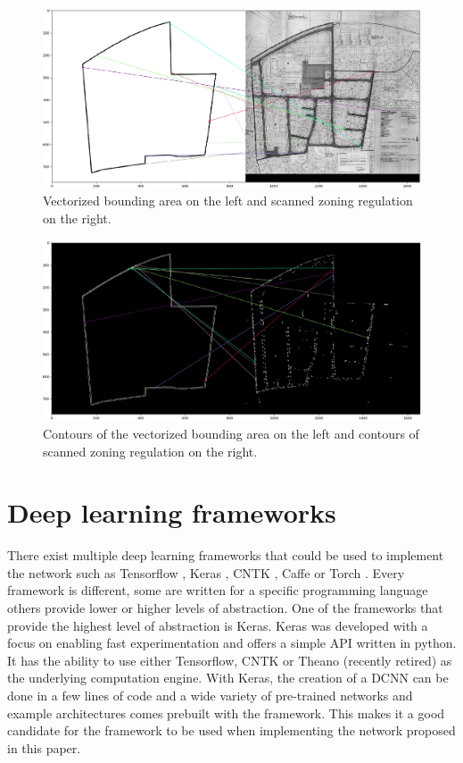 \begin{figure}[H]
    \centering
    \includegraphics[width=0.8\linewidth]{fig/test1.png}
    \caption{Vectorized bounding area on the left and scanned zoning regulation on the right.}
    \label{fig:test1}
\end{figure}

\begin{figure}[H]
    \centering
    \includegraphics[width=0.8\linewidth]{fig/test1-thresh.png}
    \caption{Contours of the vectorized bounding area on the left and contours of scanned zoning regulation on the right.}
    \label{fig:thresh}
\end{figure}

\section{Deep learning frameworks}
There exist multiple deep learning frameworks that could be used to implement the network such as Tensorflow \cite{Tensorflow2017}, Keras \cite{Keras2017}, CNTK \cite{Microsoft2017}, Caffe \cite{BerkeleyAIResearchBAIR2017} or Torch \cite{Collobert2017}.  Every framework is different, some are written for a specific programming language others provide lower or higher levels of abstraction. One of the frameworks that provide the highest level of abstraction is Keras. Keras was developed with a focus on enabling fast experimentation and offers a simple API written in python. It has the ability to use either Tensorflow, CNTK or Theano (recently retired) as the underlying computation engine. With Keras, the creation of a DCNN can be done in a few lines of code and a wide variety of pre-trained networks and example architectures comes prebuilt with the framework. This makes it a good candidate for the framework to be used when implementing the network proposed in this paper. 


